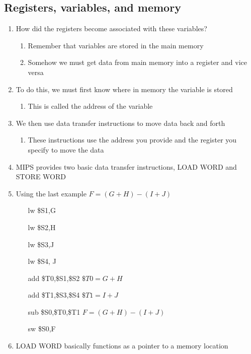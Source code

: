 \documentclass[12pt]{article}
\begin{document}
\subsection{Registers, variables, and memory}
\begin{enumerate}
  \item How did the registers become associated with these variables?
  \begin{enumerate}
    \item Remember that variables are stored in the main memory
    \item Somehow we must get data from main memory into a register and vice versa
  \end{enumerate}
  \item To do this, we must first know where in memory the variable is stored
  \begin{enumerate}
    \item This is called the address of the variable
  \end{enumerate}
  \item We then use data transfer instructions to move data back and forth
  \begin{enumerate}
    \item These instructions use the address you provide and the register you specify to move the data
  \end{enumerate}
  \item MIPS provides two basic data transfer instructions, LOAD WORD and STORE WORD
  \item Using the last example $F=(G+H)-(I+J)$
  \begin{enumerate}
    \item[lw] \$S1,G
    \item[lw] \$S2,H
    \item[lw] \$S3,J
    \item[lw] \$S4, J
    \item[add] \$T0,\$S1,\$S2 $\$T0=G+H$
    \item[add] \$T1,\$S3,\$S4 $\$T1=I+J$
    \item[sub] \$S0,\$T0,\$T1 $F=(G+H)-(I+J)$
    \item[sw] \$S0,F
  \end{enumerate}
  \item LOAD WORD basically functions as a pointer to a memory location
\end{enumerate}
\end{document}
